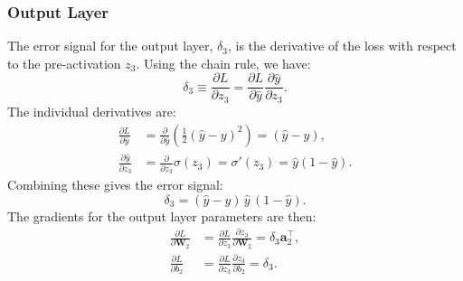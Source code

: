 \documentclass[%
  reprint,
  superscriptaddress,
  showpacs,
  showkeys,
  amsmath,amssymb,
  pra,
  longbibliography,
  floatfix,
  x11names
]{revtex4-2}
\begin{document}
\subsubsection{Output Layer}
The error signal for the output layer, $\delta_3$, is the derivative of the loss with respect to the pre-activation $z_3$. Using the chain rule, we have:
\begin{equation}
\delta_3 \equiv \frac{\partial L}{\partial z_3} = \frac{\partial L}{\partial \hat{y}} \frac{\partial \hat{y}}{\partial z_3}.
\end{equation}
The individual derivatives are:
\begin{align}
\frac{\partial L}{\partial \hat{y}} &= \frac{\partial}{\partial \hat{y}} \left( \frac{1}{2}(\hat{y}-y)^2 \right) = (\hat{y}-y), \\
\frac{\partial \hat{y}}{\partial z_3} &= \frac{\partial}{\partial z_3} \sigma(z_3) = \sigma'(z_3) = \hat{y}(1-\hat{y}).
\end{align}
Combining these gives the error signal:
\begin{equation}
\delta_3 = (\hat{y}-y)\,\hat{y}\,(1-\hat{y}).
\end{equation}
The gradients for the output layer parameters are then:
\begin{align}
\frac{\partial L}{\partial \bm{W}_2} &= \frac{\partial L}{\partial z_3} \frac{\partial z_3}{\partial \bm{W}_2} = \delta_3 \bm{a}_2^\intercal, \\
\frac{\partial L}{\partial b_2} &= \frac{\partial L}{\partial z_3} \frac{\partial z_3}{\partial b_2} = \delta_3.
\end{align}
\end{document}
